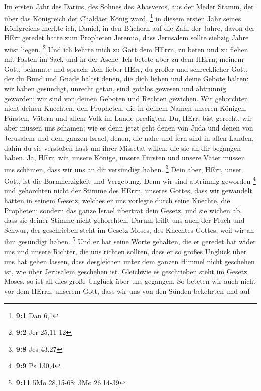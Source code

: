  Im ersten Jahr des Darius, des Sohnes des Ahasveros, aus
der Meder Stamm, der über das Königreich der Chaldäer König ward,
\footnote{\textbf{9:1} Dan 6,1}  in diesem ersten Jahr
seines Königreichs merkte ich, Daniel, in den Büchern auf die Zahl der
Jahre, davon der HErr geredet hatte zum Propheten Jeremia, dass
Jerusalem sollte siebzig Jahre wüst liegen. \footnote{\textbf{9:2} Jer
  25,11-12}  Und ich kehrte mich zu Gott dem HErrn, zu
beten und zu flehen mit Fasten im Sack und in der Asche. 
Ich betete aber zu dem HErrn, meinem Gott, bekannte und sprach: Ach
lieber HErr, du großer und schrecklicher Gott, der du Bund und Gnade
hältst denen, die dich lieben und deine Gebote halten: 
wir haben gesündigt, unrecht getan, sind gottlos gewesen und abtrünnig
geworden; wir sind von deinen Geboten und Rechten gewichen.
 Wir gehorchten nicht deinen Knechten, den Propheten, die
in deinem Namen unseren Königen, Fürsten, Vätern und allem Volk im Lande
predigten.  Du, HErr, bist gerecht, wir aber müssen uns
schämen; wie es denn jetzt geht denen von Juda und denen von Jerusalem
und dem ganzen Israel, denen, die nahe und fern sind in allen Landen,
dahin du sie verstoßen hast um ihrer Missetat willen, die sie an dir
begangen haben.  Ja, HErr, wir, unsere Könige, unsere
Fürsten und unsere Väter müssen uns schämen, dass wir uns an dir
versündigt haben. \footnote{\textbf{9:8} Jes 43,27}  Dein
aber, HErr, unser Gott, ist die Barmherzigkeit und Vergebung. Denn wir
sind abtrünnig geworden \footnote{\textbf{9:9} Ps 130,4} 
und gehorchten nicht der Stimme des HErrn, unseres Gottes, dass wir
gewandelt hätten in seinem Gesetz, welches er uns vorlegte durch seine
Knechte, die Propheten;  sondern das ganze Israel
übertrat dein Gesetz, und sie wichen ab, dass sie deiner Stimme nicht
gehorchten. Darum trifft uns auch der Fluch und Schwur, der geschrieben
steht im Gesetz Moses, des Knechtes Gottes, weil wir an ihm gesündigt
haben. \footnote{\textbf{9:11} 5Mo 28,15-68; 3Mo 26,14-39}
 Und er hat seine Worte gehalten, die er geredet hat
wider uns und unsere Richter, die uns richten sollten, dass er so großes
Unglück über uns hat gehen lassen, dass desgleichen unter dem ganzen
Himmel nicht geschehen ist, wie über Jerusalem geschehen ist.
 Gleichwie es geschrieben steht im Gesetz Moses, so ist
all dies große Unglück über uns gegangen. So beteten wir auch nicht vor
dem HErrn, unserem Gott, dass wir uns von den Sünden bekehrten und auf
